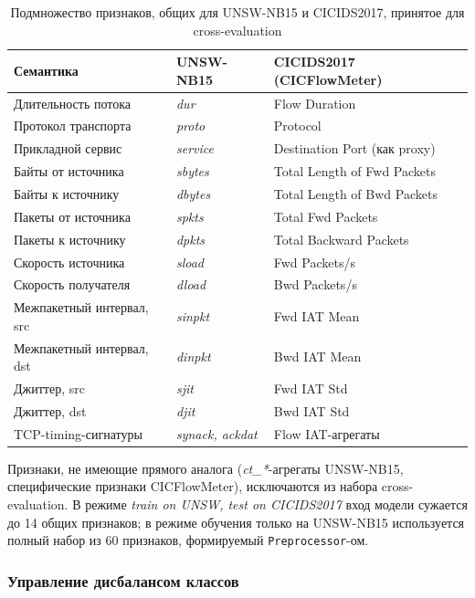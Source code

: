 \begin{table}[H]
\centering
\caption{Подмножество признаков, общих для UNSW-NB15 и CICIDS2017,
принятое для cross-evaluation}
\label{tab:common-features}
\renewcommand{\arraystretch}{1.2}
\begin{tabularx}{\linewidth}{@{}lXX@{}}
\toprule
\textbf{Семантика} & \textbf{UNSW-NB15} & \textbf{CICIDS2017 (CICFlowMeter)} \\
\midrule
Длительность потока        & \emph{dur}      & Flow Duration \\
Протокол транспорта        & \emph{proto}    & Protocol \\
Прикладной сервис          & \emph{service}  & Destination Port (как proxy) \\
Байты от источника         & \emph{sbytes}   & Total Length of Fwd Packets \\
Байты к источнику          & \emph{dbytes}   & Total Length of Bwd Packets \\
Пакеты от источника        & \emph{spkts}    & Total Fwd Packets \\
Пакеты к источнику         & \emph{dpkts}    & Total Backward Packets \\
Скорость источника         & \emph{sload}    & Fwd Packets/s \\
Скорость получателя        & \emph{dload}    & Bwd Packets/s \\
Межпакетный интервал, src  & \emph{sinpkt}   & Fwd IAT Mean \\
Межпакетный интервал, dst  & \emph{dinpkt}   & Bwd IAT Mean \\
Джиттер, src               & \emph{sjit}     & Fwd IAT Std \\
Джиттер, dst               & \emph{djit}     & Bwd IAT Std \\
TCP-timing-сигнатуры       & \emph{synack, ackdat} & Flow IAT-агрегаты \\
\bottomrule
\end{tabularx}
\end{table}

Признаки, не имеющие прямого аналога (\emph{ct\_*}-агрегаты UNSW-NB15,
специфические признаки CICFlowMeter), исключаются из набора
cross-evaluation. В режиме \emph{train on UNSW, test on CICIDS2017}
вход модели сужается до 14 общих признаков; в режиме обучения только на
UNSW-NB15 используется полный набор из 60 признаков, формируемый
\texttt{Preprocessor}-ом.

\subsubsection{Управление дисбалансом классов}

